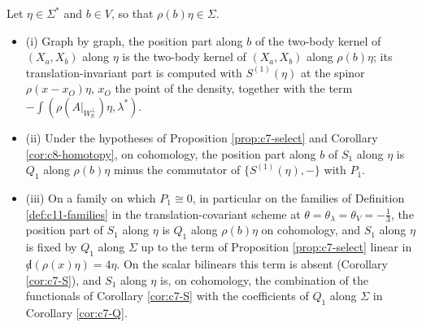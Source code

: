 \begin{proposition}
\label{prop:c11-S}
Let $\eta\in\Sigma^*$ and $b\in V$, so that $\rho(b)\eta\in\Sigma$.
\begin{itemize}
\item (i) Graph by graph, the position part along $b$ of the two-body kernel of $(X_a,X_b)$ along $\eta$ is the two-body kernel of $(X_a,X_b)$ along $\rho(b)\eta$; its translation-invariant part is computed with $S^{(1)}(\eta)$ at the spinor $\rho(x-x_O)\eta$, $x_O$ the point of the density, together with the term $-\int(\rho(A|_{W_{\mathbb R}^\perp})\eta,\lambda^*)$.
\item (ii) Under the hypotheses of Proposition \ref{prop:c7-select} and Corollary \ref{cor:c8-homotopy}, on cohomology, the position part along $b$ of $S_1$ along $\eta$ is $Q_1$ along $\rho(b)\eta$ minus the commutator of $\{S^{(1)}(\eta),-\}$ with $P_1$.
\item (iii) On a family on which $P_1\cong0$, in particular on the families of Definition \ref{def:c11-families} in the translation-covariant scheme at $\theta=\theta_\lambda=\theta_V=-\tfrac13$, the position part of $S_1$ along $\eta$ is $Q_1$ along $\rho(b)\eta$ on cohomology, and $S_1$ along $\eta$ is fixed by $Q_1$ along $\Sigma$ up to the term of Proposition \ref{prop:c7-select} linear in ${\not d}(\rho(x)\eta)=4\eta$. On the scalar bilinears this term is absent (Corollary \ref{cor:c7-S}), and $S_1$ along $\eta$ is, on cohomology, the combination of the functionals of Corollary \ref{cor:c7-S} with the coefficients of $Q_1$ along $\Sigma$ in Corollary \ref{cor:c7-Q}.
\end{itemize}
\end{proposition}

